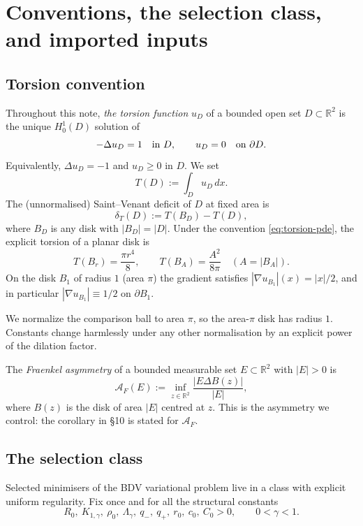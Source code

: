 \documentclass[11pt]{amsart}
\newcommand{\R}{\mathbb R}
\newcommand{\dT}{\delta_T}
\newcommand{\AF}{\mathcal A_F}
\begin{document}
\section{Conventions, the selection class, and imported inputs}

\subsection{Torsion convention}

Throughout this note, \emph{the torsion function} \(u_D\) of a bounded
open set \(D\subset\R^2\) is the unique \(H^1_0(D)\) solution of
\begin{equation}\label{eq:torsion-pde}
   -\Delta u_D=1\quad\hbox{in }D,
   \qquad
   u_D=0\quad\hbox{on }\partial D.
\end{equation}
Equivalently, \(\Delta u_D=-1\) and \(u_D\ge 0\) in \(D\).  We set
\[
   T(D):=\int_D u_D\,dx.
\]
The (unnormalised) Saint--Venant deficit of \(D\) at fixed area is
\[
   \dT(D):=T(B_D)-T(D),
\]
where \(B_D\) is any disk with \(|B_D|=|D|\).  Under the convention
\eqref{eq:torsion-pde}, the explicit torsion of a planar disk is
\begin{equation}\label{eq:disk-torsion}
   T(B_r)=\frac{\pi r^4}{8},
   \qquad
   T(B_A)=\frac{A^2}{8\pi}\quad(A=|B_A|).
\end{equation}
On the disk \(B_1\) of radius \(1\) (area \(\pi\)) the gradient satisfies
\(|\nabla u_{B_1}|(x)=|x|/2\), and in particular
\(|\nabla u_{B_1}|\equiv 1/2\) on \(\partial B_1\).

We normalize the comparison ball to area \(\pi\), so the area-\(\pi\)
disk has radius \(1\).  Constants change harmlessly under any other
normalisation by an explicit power of the dilation factor.

The \emph{Fraenkel asymmetry} of a bounded measurable set
\(E\subset\R^2\) with \(|E|>0\) is
\[
   \AF(E):=\inf_{z\in\R^2}\frac{|E\Delta B(z)|}{|E|},
\]
where \(B(z)\) is the disk of area \(|E|\) centred at \(z\).  This is
the asymmetry we control: the corollary in \S10 is stated for \(\AF\).

\subsection{The selection class}

Selected minimisers of the BDV variational problem live in a class
with explicit uniform regularity.  Fix once and for all the
structural constants
\[
   R_0,\ K_{1,\gamma},\ \rho_0,\ \Lambda_\gamma,\ q_-,\ q_+,\ r_0,\
   c_0,\ C_0>0,
   \qquad
   0<\gamma<1.
\]
\end{document}

